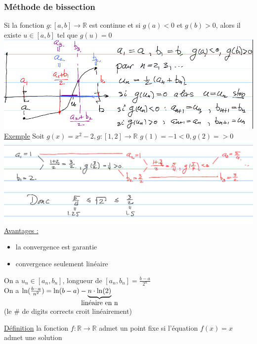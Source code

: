 \documentclass[12pt,a4paper]{article}
\newcommand{\R}{\ensuremath{\mathbb{R}} }
\newcommand{\rtor}{\ensuremath{\R \to \R} }
\newcommand{\Exemple}{\underline{Exemple} }
\newcommand{\Definition}{\underline{Définition} }
\begin{document}
{\subsubsection*{Méthode de bissection}
Si la fonction $g: [a,b] \to \R$ est continue et si $g(a) < 0$ et $g(b) > 0$, alors il existe $u \in [a,b]$ tel que $g(u) = 0$\\
\includegraphics[scale=0.5]{illustrations_Analyse/metho_bissec}\\
\Exemple Soit $g(x) = x^2 -2, g:[1,2] \to \R$ $ g(1) = -1 < 0, g(2) =  > 0$\\
\includegraphics[scale=0.5]{illustrations_Analyse/exemple_bissec}\\
\underline{Avantages :} 
\begin{itemize}
\item la convergence est garantie
\item convergence seulement linéaire
\end{itemize}
On a $u_n \in [a_n, b_n]$, longueur de $[a_n,b_n] = \frac{b-a}{2^n}$\\
On a $\ln(\frac{b-a}{n^2}) = \ln(b-a) - \underbrace{n\cdot \ln(2)}_{\mathclap{\mbox{linéaire en n}}}$\\
(le \# de digits corrects croit linéairement)
\begin{boite}
\Definition la fonction $f: \rtor$ admet un point fixe si l'équation $f(x) = x$ admet une solution
\end{boite}

}
\end{document}
